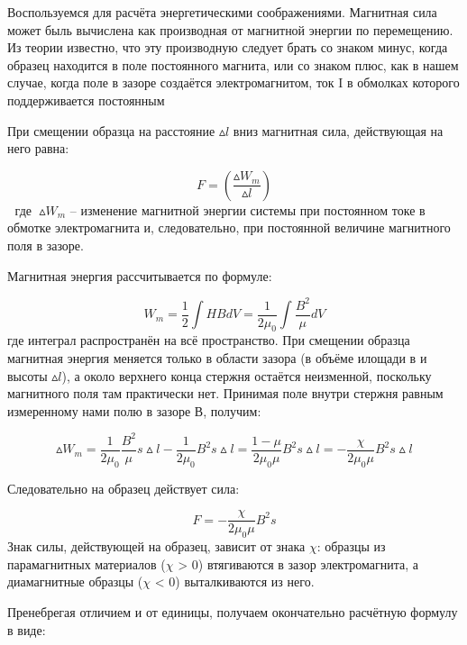 \documentclass[a4paper,12pt]{article} %
\begin{document}
Воспользуемся для расчёта энергетическими соображениями. Магнитная сила может быль вычислена как производная от магнитной энергии по
перемещению. Из теории известно, что эту производную следует брать со знаком минус, когда образец находится в поле постоянного магнита, или со знаком плюс, как в нашем случае, когда поле в зазоре создаётся электромагнитом, ток I в обмолках которого поддерживается постоянным

При смещении образца на расстояние $\vartriangle l$ вниз магнитная сила, действующая на него равна:

\begin{equation}\label{eq1}
F = (\frac{\vartriangle W_m}{\vartriangle l})
\end{equation}
где $\vartriangle W_m$ -- изменение магнитной энергии системы при постоянном токе в обмотке электромагнита и, следовательно, при постоянной величине магнитного поля в зазоре.

Магнитная энергия рассчитывается по формуле:

\begin{equation}\label{eq2}
W_m = \frac{1}{2} \int HBdV = \frac{1}{2\mu_0} \int \frac{B^2}{\mu} dV
\end{equation}
где интеграл распространён на всё пространство. При смещении образца магнитная энергия меняется только в области зазора (в объёме илощади в и высоты $\vartriangle l$), а около верхнего конца стержня остаётся неизменной, поскольку магнитного поля там практически нет. Принимая поле
внутри стержня равным измеренному нами полю в зазоре В, получим:

\begin{equation*}
\vartriangle W_m = \frac{1}{2\mu_0} \frac{B^2}{\mu} s \vartriangle l
- \frac{1}{2\mu_0} B^2 s \vartriangle l = \frac{1 - \mu}{2\mu_0 \mu} B^2 s \vartriangle l = - \frac{\chi}{2 \mu_0 \mu} B^2 s \vartriangle l
\end{equation*}

Следовательно на образец действует сила:

\begin{equation}\label{eq3}
F = - \frac{\chi}{2 \mu_0 \mu} B^2 s
\end{equation}
Знак силы, действующей на образец, зависит от знака  $\chi$: образцы из парамагнитных материалов ($\chi$ > 0) втягиваются в зазор электромагнита,
а диамагнитные образцы ($\chi$ < 0) выталкиваются из него.

Пренебрегая отличием и от единицы, получаем окончательно расчётную формулу в виде:
\end{document}
